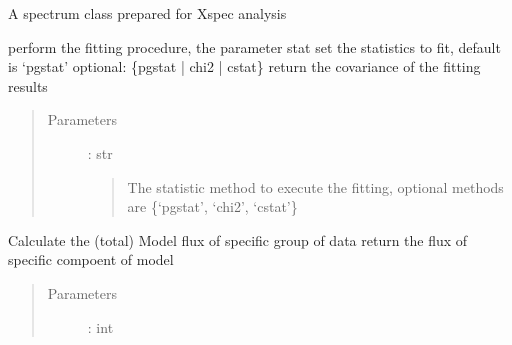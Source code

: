 \documentclass[letterpaper,10pt,english]{sphinxmanual}
\begin{document}
\begin{fulllineitems}
\label{\detokenize{APIdocs/xspecanalysis:ixpetools.xspeclib.io.XspecSpec}}
\sphinxAtStartPar
A spectrum class prepared for Xspec analysis

\begin{fulllineitems}
\label{\detokenize{APIdocs/xspecanalysis:ixpetools.xspeclib.io.XspecSpec.fit}}
\sphinxAtStartPar
perform the fitting procedure, the parameter
stat set the statistics to fit, default is ‘pgstat’
optional: \{pgstat | chi2 | cstat\}
return the covariance of the fitting results
\begin{quote}\begin{description}
\item[{Parameters}] \leavevmode
\sphinxAtStartPar
{} : str
\begin{quote}

\sphinxAtStartPar
The statistic method to execute the fitting, optional
methods are \{‘pgstat’, ‘chi2’, ‘cstat’\}
\end{quote}

\end{description}\end{quote}

\end{fulllineitems}


\begin{fulllineitems}
\label{\detokenize{APIdocs/xspecanalysis:ixpetools.xspeclib.io.XspecSpec.flux}}
\sphinxAtStartPar
Calculate the (total) Model flux of specific group
of data
return the flux of specific compoent of model
\begin{quote}\begin{description}
\item[{Parameters}] \leavevmode
\sphinxAtStartPar
{} : int
\begin{quote}


\end{quote}
\end{description}
\end{quote}
\end{fulllineitems}
\end{fulllineitems}
\end{document}
